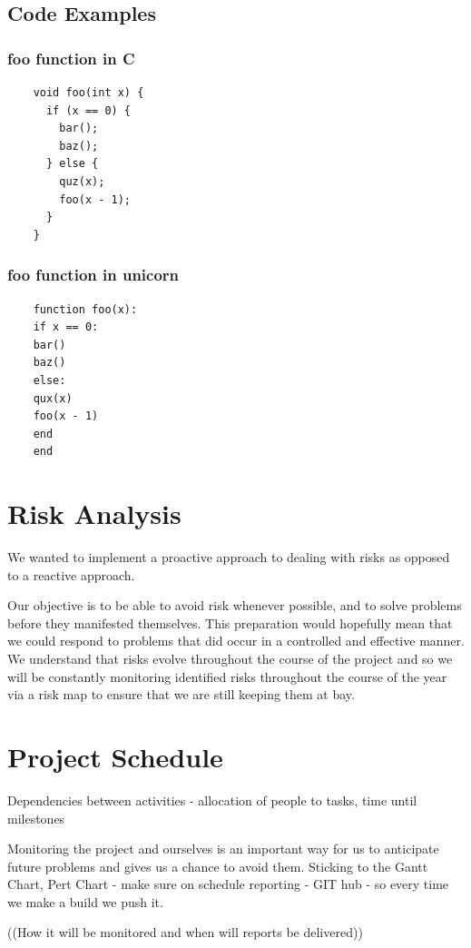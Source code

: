 \documentclass[a4paper,12pt]{article}
\begin{document}
\subsection*{Code Examples}
\begin{multicols}{2}
  \subsubsection*{foo function in C}
  \begin{lstlisting}
    void foo(int x) {
      if (x == 0) {
        bar();
        baz();
      } else {
        quz(x);
        foo(x - 1);
      }
    }
  \end{lstlisting}
  \subsubsection*{foo function in unicorn}
  \begin{lstlisting}
    function foo(x):
    if x == 0:
    bar()
    baz()
    else:
    qux(x)
    foo(x - 1)
    end
    end
  \end{lstlisting}
\end{multicols}

\pagebreak
\section*{Risk Analysis}

We wanted to implement a proactive approach to dealing with risks as opposed to a reactive approach.

Our objective is to be able to avoid risk whenever possible, and to solve problems before they manifested themselves. This preparation would hopefully mean that we could respond to problems that did occur in a controlled and effective manner. We understand that risks evolve throughout the course of the project and so we will be constantly monitoring identified risks throughout the course of the year via a risk map to ensure that we are still keeping them at bay. 

\section*{Project Schedule}

Dependencies between activities - allocation of people to tasks, time until milestones

Monitoring the project and ourselves is an important way for us to anticipate future
problems and gives us a chance to avoid them.
Sticking to the Gantt Chart, Pert Chart - make sure on schedule
reporting - GIT hub - so every time we make a build we push it.

((How it will be monitored and when will reports be delivered))
\end{document}
